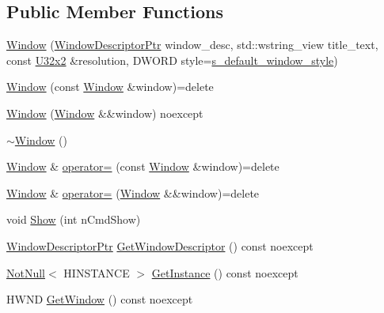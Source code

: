 \subsection*{Public Member Functions}
\begin{DoxyCompactItemize}
\item 
\mbox{\hyperlink{classmage_1_1_window_a0ac59ed8cc40bd37f88f3042f5d6d53f}{Window}} (\mbox{\hyperlink{classmage_1_1_window_ac41b052d8e8dd0571b3ec862e8f6da05}{Window\+Descriptor\+Ptr}} window\+\_\+desc, std\+::wstring\+\_\+view title\+\_\+text, const \mbox{\hyperlink{namespacemage_ae5e7ccf8a1785baaacf57b3a0f4324e2}{U32x2}} \&resolution, D\+W\+O\+RD style=\mbox{\hyperlink{classmage_1_1_window_ac680bdd3d5359f66b2dea082ef45e0da}{s\+\_\+default\+\_\+window\+\_\+style}})
\item 
\mbox{\hyperlink{classmage_1_1_window_a910a63ff907559e693cb9abd3539523e}{Window}} (const \mbox{\hyperlink{classmage_1_1_window}{Window}} \&window)=delete
\item 
\mbox{\hyperlink{classmage_1_1_window_a32878487dd2e2f46eaaf97aaf220ee33}{Window}} (\mbox{\hyperlink{classmage_1_1_window}{Window}} \&\&window) noexcept
\item 
\mbox{\hyperlink{classmage_1_1_window_a71d3ce0b3141e89121ae09e8fc64a217}{$\sim$\+Window}} ()
\item 
\mbox{\hyperlink{classmage_1_1_window}{Window}} \& \mbox{\hyperlink{classmage_1_1_window_ab62aeec5dee0c36b9926894e2684ff3d}{operator=}} (const \mbox{\hyperlink{classmage_1_1_window}{Window}} \&window)=delete
\item 
\mbox{\hyperlink{classmage_1_1_window}{Window}} \& \mbox{\hyperlink{classmage_1_1_window_aa52284540a75c98a2aa768a5d6410378}{operator=}} (\mbox{\hyperlink{classmage_1_1_window}{Window}} \&\&window)=delete
\item 
void \mbox{\hyperlink{classmage_1_1_window_a017de58a756a2cc4dde0ccb3caf589ff}{Show}} (int n\+Cmd\+Show)
\item 
\mbox{\hyperlink{classmage_1_1_window_ac41b052d8e8dd0571b3ec862e8f6da05}{Window\+Descriptor\+Ptr}} \mbox{\hyperlink{classmage_1_1_window_add5b20d191810ba04000728c7517543f}{Get\+Window\+Descriptor}} () const noexcept
\item 
\mbox{\hyperlink{namespacemage_a8769f9d670d6b585ea306cb1062af94b}{Not\+Null}}$<$ H\+I\+N\+S\+T\+A\+N\+CE $>$ \mbox{\hyperlink{classmage_1_1_window_a809eff149af9fd2e66eec176078d0127}{Get\+Instance}} () const noexcept
\item 
H\+W\+ND \mbox{\hyperlink{classmage_1_1_window_a0f791c3fb8f5be34a17ae2a93767a613}{Get\+Window}} () const noexcept

\end{DoxyCompactItemize}
